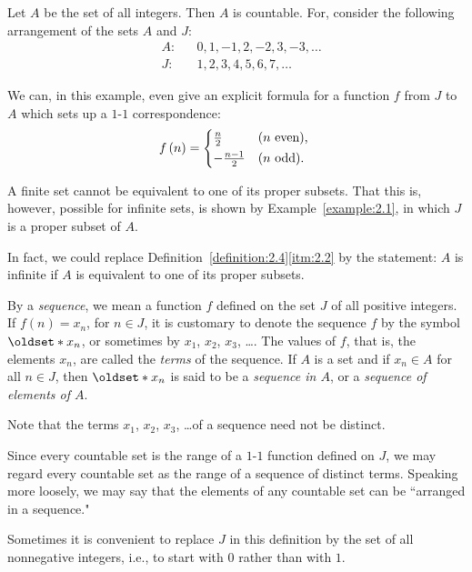 \begin{example}\label{example:2.1}
    Let \(A\) be the set of all integers. Then \(A\) is countable. For, consider the following arrangement of the sets \(A\) and \(J\):
    \begin{align*}
        &A\colon&&0,1,-1,2,-2,3,-3,\ldots\\
        &J\colon&&1,2,3,4,5,6,7,\ldots
    \end{align*}
\end{example}

We can, in this example, even give an explicit formula for a function \(f\) from \(J\) to \(A\) which sets up a \(1\)-\(1\) correspondence:
\begin{equation*}
    f\left(n\right)=
    \begin{cases*}
        \frac{n}{2} & (\(n\) even), \\
        -\frac{n-1}{2} & (\(n\) odd). \\
    \end{cases*}
\end{equation*}

\begin{remark}
    A finite set cannot be equivalent to one of its proper subsets. That this is, however, possible for infinite sets, is shown by Example~\ref{example:2.1}, in which \(J\) is a proper subset of \(A\).
    
    In fact, we could replace Definition~\ref{definition:2.4}\ref{itm:2.2} by the statement: \(A\) is infinite if \(A\) is equivalent to one of its proper subsets.
\end{remark}

\begin{definition}
    By a \emph{sequence}, we mean a function \(f\) defined on the set \(J\) of all positive integers. If \(f\left(n\right)=x_n\), for \(n\in J\), it is customary to denote the sequence \(f\) by the symbol \(\set{x_n}\), or sometimes by \(x_1\), \(x_2\), \(x_3\), \ldots. The values of \(f\), that is, the elements \(x_n\), are called the \emph{terms} of the sequence. If \(A\) is a set and if \(x_n\in A\) for all \(n\in J\), then \(\set{x_n}\) is said to be a \emph{sequence in \(A\)}, or a \emph{sequence of elements of \(A\)}.
    
    Note that the terms \(x_1\), \(x_2\), \(x_3\), \ldots of a sequence need not be distinct.
    
    Since every countable set is the range of a \(1\)-\(1\) function defined on \(J\), we may regard every countable set as the range of a sequence of distinct terms. Speaking more loosely, we may say that the elements of any countable set can be ``arranged in a sequence."
    
    Sometimes it is convenient to replace \(J\) in this definition by the set of all nonnegative integers, i.e., to start with \(0\) rather than with \(1\).
\end{definition}

